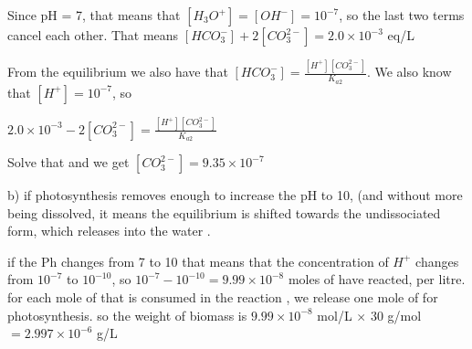 \documentclass[addpoints,12pt]{exam}
\begin{document}
\begin{questions}
\begin{solution}
{Since pH = 7, that means that \([H_3O^+] = [OH^-] = 10^{-7}\), so the last two terms cancel each other. That means \([HCO_3^-] + 2[CO_3^{2-}] = 2.0 \times 10^{-3}\) eq/L

From the equilibrium we also have that \([HCO_3^-] = \frac{[H^+][CO_3^{2-}]}{K_{a2}}\). We also know that \([H^+] = 10^{-7}\), so

\(2.0\times10^{-3} - 2[CO_3^{2-}] = \frac{[H^+][CO_3^{2-}]}{K_{a2}}\)

Solve that and we get \([CO_3^{2-}] = 9.35\times10^{-7}\)

\medskip b) if photosynthesis removes enough  to increase the pH to 10, (and without more  being dissolved, it means the equilibrium is shifted towards the undissociated form, which releases  into the water .

if the Ph changes from 7 to 10 that means that the concentration of \(H^+\) changes from \(10^{-7}\) to \(10^{-10}\), so \(10^{-7} - 10^{-10} = 9.99\times10^{-8}\) moles of  have reacted, per litre. for each mole of  that is consumed in the reaction , we release one mole of  for photosynthesis. so the weight of biomass is \(9.99\times10^{-8}\) mol/L \(\times\) 30 g/mol \(= 2.997\times10^{-6}\) g/L
}
\end{solution}

\end{questions}
\end{document}
